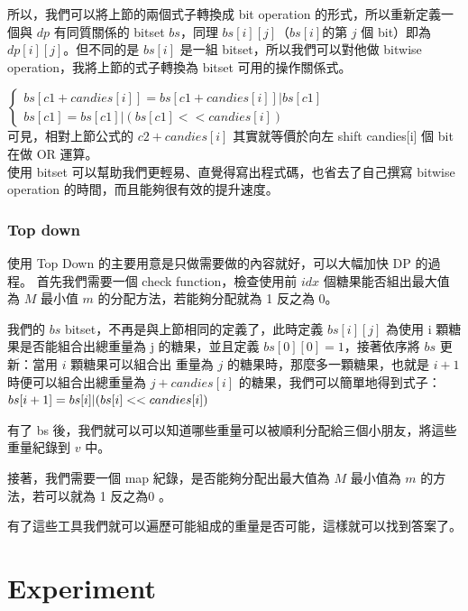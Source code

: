 \documentclass[12pt]{article}
\begin{document}
	所以，我們可以將上節的兩個式子轉換成 bit operation 的形式，所以重新定義一個與 $dp$ 有同質關係的 bitset $bs$，同理 $bs[i][j]$（$bs[i]$的第 $j$ 個 bit）即為 $dp[i][j]$。但不同的是 $bs[i]$ 是一組 bitset，所以我們可以對他做 bitwise operation，我將上節的式子轉換為 bitset 可用的操作關係式。
	 
	 	$\left\{\begin{matrix}
		 	bs[c1+candies[i]] = bs[c1+candies[i]] | bs[c1]\\ 
	 		bs[c1] = bs[c1] | (bs[c1] << candies[i])
		 \end{matrix}\right.$\\
	  
 	可見，相對上節公式的 $c2+candies[i]$ 其實就等價於向左 shift candies[i] 個 bit 在做 OR 運算。\\
 	
 	使用 bitset 可以幫助我們更輕易、直覺得寫出程式碼，也省去了自己撰寫 bitwise operation 的時間，而且能夠很有效的提升速度。
 	
 	\section{Top down}
 	使用 Top Down 的主要用意是只做需要做的內容就好，可以大幅加快 DP 的過程。
 	首先我們需要一個 check function，檢查使用前 $idx$ 個糖果能否組出最大值為 $M$ 最小值 $m$ 的分配方法，若能夠分配就為 1 反之為 0。
 	
 	我們的 $bs$ bitset，不再是與上節相同的定義了，此時定義 $bs[i][j]$ 為使用 i 顆糖果是否能組合出總重量為 j 的糖果，並且定義 $bs[0][0] = 1$，接著依序將 $bs$ 更新：當用 $i$ 顆糖果可以組合出 重量為 $j$ 的糖果時，那麼多一顆糖果，也就是 $i+1$ 時便可以組合出總重量為 $j+candies[i]$ 的糖果，我們可以簡單地得到式子：\\
 	
 	$
 	bs[i+1] = bs[i] | (bs[i] << candies[i])\\
 	$
 	
 	有了 bs 後，我們就可以可以知道哪些重量可以被順利分配給三個小朋友，將這些重量紀錄到 $v$ 中。
 	
 	接著，我們需要一個 map 紀錄，是否能夠分配出最大值為 $M$ 最小值為 $m$ 的方法，若可以就為 1 反之為0 。
 	
 	有了這些工具我們就可以遍歷可能組成的重量是否可能，這樣就可以找到答案了。
 	
	\part{Experiment}
	
\end{document}

